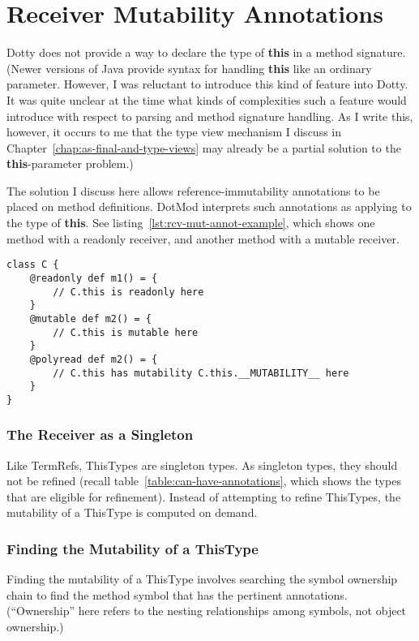 \documentclass[11pt]{report}
\newcommand{\cdf}{\bf\ttfamily} %
\newcommand{\cd}{\cdf\small}  %
\begin{document}
\section{Receiver Mutability Annotations} \label{sec:receiver-annotations}

Dotty does not provide a way to declare the type of {\cd this} in a method signature. (Newer versions of Java provide syntax for handling {\cd this} like an ordinary parameter. However, I was reluctant to introduce this kind of feature into Dotty. It was quite unclear at the time what kinds of complexities such a feature would introduce with respect to parsing and method signature handling. As I write this, however, it occurs to me that the type view mechanism I discuss in Chapter~\ref{chap:as-final-and-type-views} may already be a partial solution to the {\cd this}-parameter problem.)

The solution I discuss here allows reference-immutability annotations to be placed on method definitions. DotMod interprets such annotations as applying to the type of {\cd this}. See listing~\ref{lst:rcv-mut-annot-example}, which shows one method with a readonly receiver, and another method with a mutable receiver.

\begin{lstlisting}[float=htbp, caption={Receiver Mutability Annotation Example}, label={lst:rcv-mut-annot-example}]
class C {
	@readonly def m1() = {
		// C.this is readonly here
	}
	@mutable def m2() = {
		// C.this is mutable here
	}
	@polyread def m2() = {
		// C.this has mutability C.this.__MUTABILITY__ here
	}
}
\end{lstlisting}

\subsubsection{The Receiver as a Singleton}

Like TermRefs, ThisTypes are singleton types. As singleton types, they should not be refined (recall table~\ref{table:can-have-annotations}, which shows the types that are eligible for refinement).
Instead of attempting to refine ThisTypes, the mutability of a ThisType is computed on demand.

\subsubsection{Finding the Mutability of a ThisType}

Finding the mutability of a ThisType involves searching the symbol ownership chain to find the method symbol that has the pertinent annotations. (``Ownership'' here refers to the nesting relationships among symbols, not object ownership.)
\end{document}
